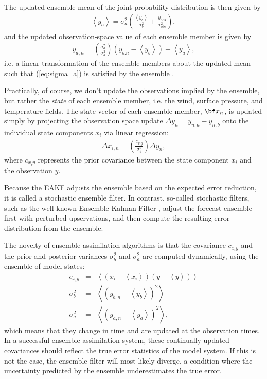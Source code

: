 The updated ensemble mean of the joint probability distribution is then given by
\begin{eqnarray}
\left< y_a \right> = \sigma_a^2 
\left(
\frac{\left< y_b \right>}{\sigma_b^2} +
\frac{y_{\text{obs}} }{\sigma_{\text{obs}}^2} 
\right),
\end{eqnarray}
and the updated observation-space value of each ensemble member is given by 
\begin{eqnarray}
 y_{a,n} = 
\left( \frac{\sigma_a^2}{\sigma_b^2}  \right)
\left(
y_{b.n} - \left< y_b  \right> \right)
+ \left< y_a \right>,
\end{eqnarray}
i.e. a linear transformation of the ensemble members about the updated mean such that (\ref{eq:sigma_a}) is satisfied by the ensemble \citep{andersoncollins2006}.


Practically, of course, we don't update the observations implied by the ensemble, but rather the \textit{state} of each ensemble member, i.e. the wind, surface pressure, and temperature fields. 
The state vector of each ensemble member, ${\bf x}_n$, is updated simply by projecting the observation space update $\Delta y_n = y_{n,a}-y_{n,b}$ onto the individual state components $x_i$ via linear regression:
\begin{eqnarray}
 \Delta x_{i,n} = 
\left(
\frac{c_{x_iy}}{\sigma_b^2}
\right)
\Delta y_n,
\end{eqnarray}
where $c_{x_iy}$ represents the prior covariance between the state component $x_i$ and the observation $y$.

Because the EAKF adjusts the ensemble based on the expected error reduction, it is called a stochastic ensemble filter.
In contrast, so-called stochastic filters, such as the well-known Ensemble Kalman Filter \citep{evensen2003}, adjust the forecast ensemble first with perturbed upservations, and then compute the resulting error distribution from the ensemble.

The novelty of ensemble assimilation algorithms is that the covariance $c_{x_iy}$ and the prior and posterior variances $\sigma_b^2$ and $\sigma_a^2$ are computed dynamically, using the ensemble of model states:
\begin{eqnarray}
c_{x_iy} &=& 
\left<
\left( x_i - \left< x_i \right>   \right)
\left( y - \left< y \right>   \right)
\right> 
\label{eq:covariance} \\
%
\sigma_b^2 &=& 
\left<
\left( y_{b,n} - \left< y_b \right>   \right)^2
\right>  
\label{eq:sigma_b} \\
%
\sigma_a^2 &=& 
\left<
\left( y_{a,n} - \left< y_a \right>   \right)^2
\right>,  
\label{eq:sigma_a} 
\end{eqnarray}
%
which means that they change in time and are updated at the observation times.
In a successful ensemble assimilation system, these continually-updated covariances should reflect the true error statistics of the model system.
If this is not the case, the ensemble filter will most likely diverge, a condition where the uncertainty predicted by the ensemble underestimates the true error.


